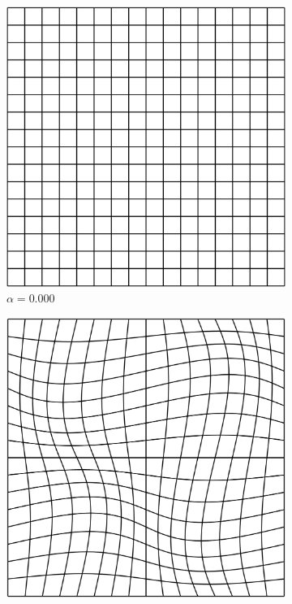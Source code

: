 \documentclass[../doc.tex]{subfiles}
\begin{document}
\begin{figure}
\centering
\begin{subfigure}{.24\textwidth}
	\centering
	\includegraphics[width=\textwidth]{data/img/sine0.png}
	\caption{$\alpha = 0.000$}
\end{subfigure}\enspace
\begin{subfigure}{.24\textwidth}
	\centering
	\includegraphics[width=\textwidth]{data/img/sine50.png}

\end{subfigure}
\end{figure}
\end{document}
